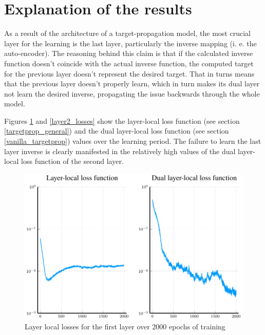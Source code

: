 \section{Explanation of the results}

As a result of the architecture of a target-propagation model, the most crucial layer for the learning is the last layer, particularly the inverse mapping (i. e. the auto-encoder). The reasoning behind this claim is that if the calculated inverse function doesn't coincide with the actual inverse function, the computed target for the previous layer doesn't represent the desired target. That in turns means that the previous layer doesn't properly learn, which in turn makes its dual layer not learn the desired inverse, propagating the issue backwards through the whole model.

Figures \ref{layer1_losses} and \ref{layer2_losses} show the layer-local loss function (see section \ref{targetprop_general}) and the dual layer-local loss function (see section \ref{vanilla_targetprop}) values over the learning period. The failure to learn the last layer inverse is clearly manifested in the relatively high values of the dual layer-local loss function of the second layer.

\begin{figure}
	\centering
	\includegraphics[width=\textwidth]{images/relu-layer1/layer1.pdf}
	\caption{Layer local losses for the first layer over 2000 epochs of training}\label{layer1_losses}
\end{figure}

